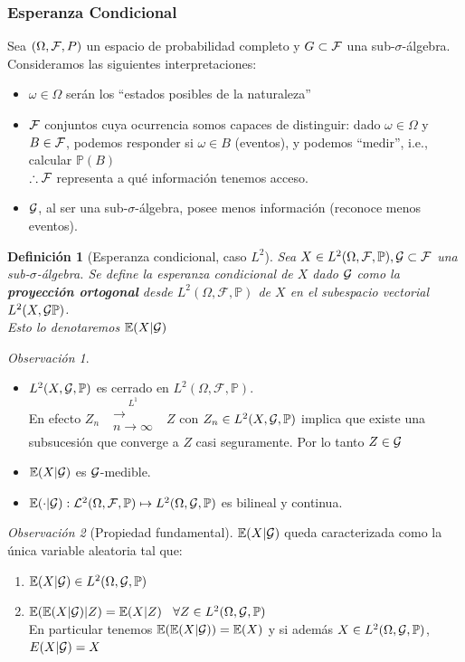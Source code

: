 \documentclass[letterpaper,11pt]{article} %
\def\espacio{\hspace{.25cm}\,}
\theoremstyle{defbreak}
\newtheorem{definition}{Definición}[subsection]
\theoremstyle{propbreak}
\theoremstyle{remark}
\newtheorem{remark}{Observación}[subsection]
\theoremstyle{break}
\def\E{\mathbb{E}}
\def\P{\mathbb{P}}
\def\convldos{\mbox{ }\overset{L^2}{\substack{\longrightarrow \\n \to \infty}}\mbox{ }}
\def\convldos{\mbox{ }\overset{L^1}{\substack{\longrightarrow \\n \to \infty}}\mbox{ }}
\def\edp{(\Omega,\mathcal{F},\mathbb{P})}
\def\beforeitemize{\leavevmode \vspace{-0.5\baselineskip}}
\begin{document}
\subsubsection{Esperanza Condicional} %
Sea $(\Omega,\mathcal{F},P)$ un espacio de probabilidad completo y $G\subset \mathcal{F}$ una sub-$\sigma$-álgebra. Consideramos las siguientes interpretaciones:
\begin{itemize}
    \item $\omega\in\Omega$ serán los ``estados posibles de la naturaleza''
    \item $\mathcal{F}$ conjuntos cuya ocurrencia somos capaces de distinguir: dado $\omega \in\Omega$ y $B\in\mathcal{F}$, podemos responder si $\omega\in B$ (eventos), y podemos ``medir'', i.e., calcular $\P(B)$ \\
    $\therefore\mathcal{F}$ representa a qué información tenemos acceso.
    \item $\mathcal{G}$, al ser una sub-$\sigma$-álgebra, posee menos información (reconoce menos eventos).
\end{itemize}
\begin{definition}[Esperanza condicional, caso $L^2$]
Sea $X\in L^2\edp, \G\subset\F$ una sub-$\sigma$-álgebra. Se define la esperanza condicional de $X$ dado $\mathcal{G}$ como la \textbf{proyección ortogonal} desde $L^2\edp$ de $X$ en el subespacio vectorial $L^2(X,\G\P)$.
\\ Esto lo denotaremos $\E(X|\G)$
\end{definition}
\begin{remark}
\beforeitemize
\begin{itemize}
    \item $L^2(X,\G,\P)$ es cerrado en $L^2\edp$.
    \\ En efecto $Z_n\convldos Z$ con $Z_n\in L^2(X,\G,\P)$ implica que existe una subsucesión que converge a $Z$ casi seguramente. Por lo tanto $Z\in\mathcal{G}$
    \item $\E(X|\G)$ es $\mathcal{G}$-medible.
    \item $\E(\cdot|\G):\L^2\edp\mapsto L^2(\Omega,\G,\P)$ es bilineal y continua.
\end{itemize}
\end{remark}
\begin{remark}[Propiedad fundamental]
$\E(X|\G)$ queda caracterizada como la única variable aleatoria tal que:
\begin{enumerate}
    \item $\E(X|\G)\in L^2(\Omega,\G,\P)$
    \item $\E(\E(X|\G)|Z) = \E(X|Z) \espacio \forall Z\in L^2(\Omega,\G,\P)$
    \vspace{.4cm}\\ En particular tenemos $\E(\E(X|\G)) = \E(X)$ y si además $X\in L^2(\Omega,\G,\P)$, $E(X|\mathcal{G})=X$
\end{enumerate}
\end{remark}
\end{document}
